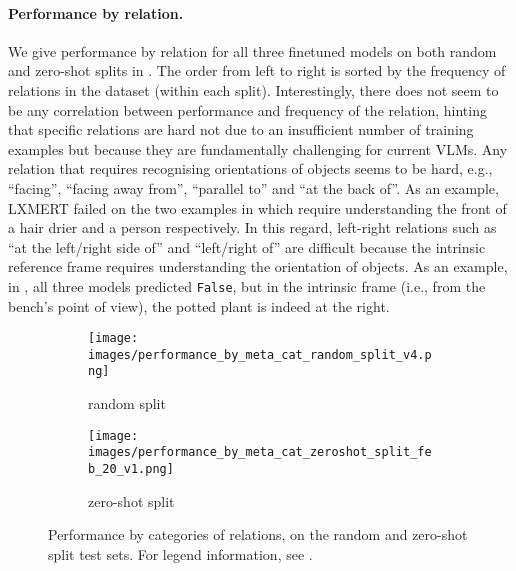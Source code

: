 \paragraph{Performance by relation.} We give performance by relation for all three finetuned models on both random and zero-shot splits in . The order from left to right is sorted by the frequency of relations in the dataset (within each split). Interestingly, there does not seem to be any correlation between performance and frequency of the relation, hinting that specific relations are hard not due to an insufficient number of training examples but because they are fundamentally challenging for current VLMs. Any relation that requires recognising orientations of objects seems to be hard, e.g., ``facing'', ``facing away from'', ``parallel to'' and ``at the back of''. As an example, LXMERT failed on the two examples in  which require understanding the front of a hair drier and a person respectively.
In this regard, left-right relations such as ``at the left/right side of'' and ``left/right of'' are difficult because the intrinsic reference frame requires understanding the orientation of objects. As an example, in , all three models predicted \texttt{False}, but in the intrinsic frame (i.e., from the bench's point of view), the potted plant is indeed at the right.




\begin{figure}[t]
    \centering
    \begin{subfigure}[b]{\linewidth}
    \centering
    \texttt{[image: images/performance\_by\_meta\_cat\_random\_split\_v4.png]}
    \caption{random split}
     \end{subfigure}
     \begin{subfigure}[b]{\linewidth}
         \centering
    \texttt{[image: images/performance\_by\_meta\_cat\_zeroshot\_split\_feb\_20\_v1.png]}
    \caption{zero-shot split}
     \end{subfigure}
\caption{Performance by categories of relations, on the random and zero-shot split test sets. For legend information, see .}
\label{fig:performance_by_meta_cat}
\end{figure}

